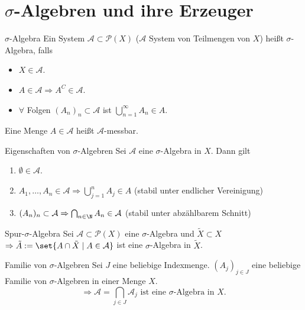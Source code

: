 \section*{\(\sigma\)-Algebren und ihre Erzeuger}

\begin{karte}{\(\sigma\)-Algebra}
	Ein System \(\mathcal{A} \subset \mathcal{P}(X)\) (\(\mathcal{A}\) System von Teilmengen von \(X\)) 
	heißt \(\sigma\)-Algebra, falls 
	\begin{itemize}
		\item \( X \in \mathcal{A} \).
		\item \( A \in \mathcal{A} \Rightarrow A^C \in \mathcal{A} \).
		\item \(\forall\) Folgen \( (A_n)_n \subset \mathcal{A} \) ist 
		\( \bigcup_{n=1}^\infty A_n \in A \). 
	\end{itemize}
	Eine Menge \(A \in \mathcal{A}\) heißt \(\mathcal{A}\)-messbar.
\end{karte}

\begin{karte}{Eigenschaften von \(\sigma\)-Algebren}
	Sei \(\mathcal{A}\) eine \(\sigma\)-Algebra in \(X\). Dann gilt 
	\begin{enumerate}
		\item \(\emptyset \in \mathcal{A}\).
		\item \( A_1, \ldots, A_n \in \mathcal{A}\Rightarrow \bigcup_{j=1}^n A_j \in A \) (stabil unter endlicher Vereinigung)
		\item \( (A_n)_n \subset \mathcal{A} \Rightarrow \bigcap_{n\in\N} A_n \in \mathcal{A} \) (stabil unter abzählbarem Schnitt)
	\end{enumerate}
\end{karte}

\begin{karte}{Spur-\(\sigma\)-Algebra}
	Sei \(\mathcal{A} \subset \mathcal{P}(X)\) eine \(\sigma\)-Algebra und \(\tilde{X} \subset X\) 
	\( \Rightarrow \tilde{A} := \set{ A \cap \tilde{X} \;\vert\; A \in \mathcal{A} } \) ist eine 
	\(\sigma\)-Algebra in \(\tilde{X}\).
\end{karte}

\begin{karte}{Familie von \(\sigma\)-Algebren}
	Sei \(J\) eine beliebige Indexmenge. 
	\((A_j)_{j\in J}\) eine beliebige Familie von 
	\(\sigma\)-Algebren in einer Menge \(X\).
	\[ \Rightarrow \mathcal{A} = \bigcap_{j\in J} \mathcal{A}_j \text{ ist eine \(\sigma\)-Algebra in } X. \]
\end{karte}

